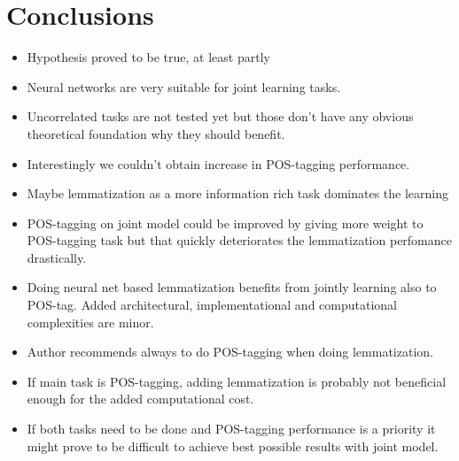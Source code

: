 \documentclass[12pt,a4paper,english
]{tutthesis}
\begin{document}
\chapter{Conclusions}
\label{ch:conclusions}
\begin{itemize}
\item Hypothesis proved to be true, at least partly
\item Neural networks are very suitable for joint learning tasks.
\item Uncorrelated tasks are not tested yet but those don't have any obvious theoretical foundation why they should benefit.
\item Interestingly we couldn't obtain increase in POS-tagging performance.
\item Maybe lemmatization as a more information rich task dominates the learning
\item POS-tagging on joint model could be improved by giving more weight to POS-tagging task but that quickly deteriorates the lemmatization perfomance drastically.
\item Doing neural net based lemmatization benefits from jointly learning also to POS-tag. Added architectural, implementational and computational complexities are minor.
\item Author recommends always to do POS-tagging when doing lemmatization.
\item If main task is POS-tagging, adding lemmatization is probably not beneficial enough for the added computational cost.
\item If both tasks need to be done and POS-tagging performance is a priority it might prove to be difficult to achieve best possible results with joint model.
\end{itemize}

%
%
\newpage



\renewcommand{\bibname}{Bibliography}     %
\addcontentsline{toc}{chapter}{\bibname}  %


\printbibliography                  %
\end{document}
